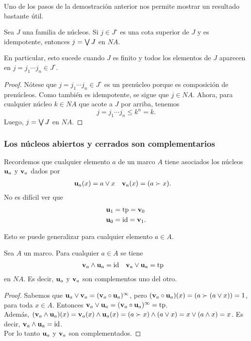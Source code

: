 Uno de los pasos de la demostración anterior
nos permite mostrar un resultado bastante útil.
\begin{corollary}
    Sea $J$ una familia de núcleos.
    Si $j\in J^\circ$ es una cota superior de $J$
    y es idempotente, entonces $j=\bigvee J$ en $NA$.
    
    En particular, esto sucede cuando $J$ es finito y todos los
    elementos de $J$ aparecen en $j=j_1\cdots j_n\in J^\circ$.
\end{corollary}
\begin{proof}
    Nótese que $j=j_1\cdots j_n\in J^\circ$
    es un prenúcleo porque es composición de prenúcleos.
    Como también es idempotente, se sigue que $j\in NA$.
    Ahora, para cualquier núcleo $k\in NA$ que acote a $J$ por arriba,
    tenemos
    \[
        j = j_1\cdots j_n \leq k^n = k
    .\]
    Luego, $j=\bigvee J$ en $NA$.
\end{proof}

\subsubsection{Los núcleos abiertos y cerrados son complementarios}

Recordemos que cualquier elemento $a$ de un marco $A$ tiene
asociados los núcleos $\mathbf u_{a}$ y $\mathbf v_{a}$ dados por
\begin{align*}
  \mathbf u_{a}(x) &= a\vee x
  &
  \mathbf v_{a}(x) &= (a\succ x).
\end{align*}
No es difícil ver que
\begin{align*}
  \mathbf u_{1} &= \mathrm{tp} = \mathbf v_{0} \\
  \mathbf u_{0} &= \mathrm{id} = \mathbf v_{1}.
\end{align*}

Esto se puede generalizar para cualquier elemento $a\in A$.

\begin{lemma}
  Sea $A$ un marco.
  Para cualquier $a\in A$ se tiene
  \begin{align*}
    \mathbf v_{a}\wedge\mathbf u_{a} &= \mathrm{id}
    &
    \mathbf v_{a}\vee\mathbf u_{a} &= \mathrm{tp}
  \end{align*}
  en $NA$.
  Es decir, $\mathbf u_{a}$ y $\mathbf v_{a}$ son complementos uno del otro.
\end{lemma}
\begin{proof}
Sabemos que $\mathbf u_{a}\vee \mathbf v_{a}=(\mathbf v_{a}\circ \mathbf u_{a})^\infty$, pero $(\mathbf v_{a}\circ \mathbf u_{a})(x)=(a\succ (a\vee x))=1$, para toda $x\in A$. Entonces $\mathbf v_{a}\vee \mathbf u_{a}=(\mathbf v_{a}\circ \mathbf u_{a})^\infty=\mathrm{tp}$.\\
Además, $(\mathbf v_{a}\wedge \mathbf u_{a})(x)=\mathbf v_{a}(x)\wedge \mathbf u_{a}(x)=(a\succ x)\wedge (a\vee x)=x\vee (a\wedge x)=x$. Es decir, $\mathbf v_{a}\wedge \mathbf u_{a}=\mathrm{id}$.\\
Por lo tanto $\mathbf u_{a}$ y $\mathbf v_{a}$ son complementados.
\end{proof}

